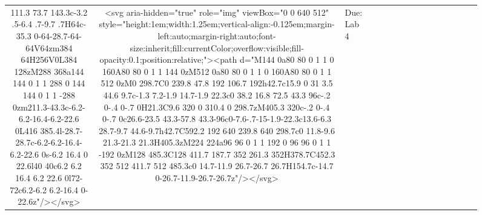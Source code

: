 \documentclass[
]{article}
\begin{document}
\begin{figure*}
\begin{longtable*}{cclllccccccccccl}
111.3 73.7 143.3c-3.2 .5-6.4 .7-9.7 .7H64c-35.3 0-64-28.7-64-64V64zm384 64H256V0L384 128zM288 368a144 144 0 1 1 288 0 144 144 0 1 1 -288 0zm211.3-43.3c-6.2-6.2-16.4-6.2-22.6 0L416 385.4l-28.7-28.7c-6.2-6.2-16.4-6.2-22.6 0s-6.2 16.4 0 22.6l40 40c6.2 6.2 16.4 6.2 22.6 0l72-72c6.2-6.2 6.2-16.4 0-22.6z"/></svg> & <svg aria-hidden="true" role="img" viewBox="0 0 640 512" style="height:1em;width:1.25em;vertical-align:-0.125em;margin-left:auto;margin-right:auto;font-size:inherit;fill:currentColor;overflow:visible;fill-opacity:0.1;position:relative;"><path d="M144 0a80 80 0 1 1 0 160A80 80 0 1 1 144 0zM512 0a80 80 0 1 1 0 160A80 80 0 1 1 512 0zM0 298.7C0 239.8 47.8 192 106.7 192h42.7c15.9 0 31 3.5 44.6 9.7c-1.3 7.2-1.9 14.7-1.9 22.3c0 38.2 16.8 72.5 43.3 96c-.2 0-.4 0-.7 0H21.3C9.6 320 0 310.4 0 298.7zM405.3 320c-.2 0-.4 0-.7 0c26.6-23.5 43.3-57.8 43.3-96c0-7.6-.7-15-1.9-22.3c13.6-6.3 28.7-9.7 44.6-9.7h42.7C592.2 192 640 239.8 640 298.7c0 11.8-9.6 21.3-21.3 21.3H405.3zM224 224a96 96 0 1 1 192 0 96 96 0 1 1 -192 0zM128 485.3C128 411.7 187.7 352 261.3 352H378.7C452.3 352 512 411.7 512 485.3c0 14.7-11.9 26.7-26.7 26.7H154.7c-14.7 0-26.7-11.9-26.7-26.7z"/></svg> & Due: Lab 4 \\ 

\end{longtable*}
\end{figure*}
\end{document}
